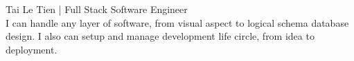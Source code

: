 {\Huge Tai Le Tien} | Full Stack Software Engineer\\
\vspace{8pt}
I can handle any layer of software, from visual aspect to logical schema
database design. I also can setup and manage development life circle, from
idea to deployment.\\
